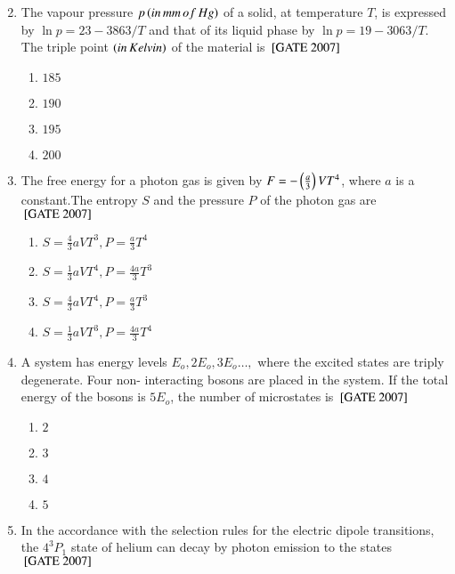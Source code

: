 \documentclass[journal]{IEEEtran}
\begin{document}
\begin{enumerate}
\begin{multicols}{4}
\begin{enumerate}
\end{enumerate}
\end{multicols}
\item The vapour pressure $p\left(in \, mm \, of \,Hg\right)$ of a solid, at temperature $T$, is expressed by $\ln{p}=23-3863/T$ and that of its liquid phase by $\ln{p}= 19-3063/T$. The triple point $\left(in \, Kelvin\right)$ of the material is \hfill{${}\left[\text{GATE 2007}\right]$} 
\begin{multicols}{4}
\begin{enumerate}
    \item $185$
    \item $190$
    \item $195$
    \item $200$
\end{enumerate}
\end{multicols}
\item The free energy for a photon gas is given by $F = -\left(\frac{a}{3}\right)VT^4$, where $a$ is a constant.The entropy $S$ and the pressure $P$ of the photon gas are \hfill{${}\left[\text{GATE 2007}\right]$} 
\begin{multicols}{2}
\begin{enumerate}
    \item $S=\frac{4}{3}aVT^3, P=\frac{a}{3}T^4$
    \item $S=\frac{1}{3}aVT^4, P=\frac{4a}{3}T^3$
    \item $S=\frac{4}{3}aVT^4, P=\frac{a}{3}T^3$
    \item $S=\frac{1}{3}aVT^3, P=\frac{4a}{3}T^4$
\end{enumerate}
\end{multicols}
\item A system has energy levels $E_o,2E_o,3E_o\dots,$ where the excited states are triply degenerate. Four non- interacting bosons are placed in the system. If the total energy of the bosons is $5E_o$, the number of microstates is \hfill{${}\left[\text{GATE 2007}\right]$} 
\begin{multicols}{4}
\begin{enumerate}
    \item $2$
    \item $3$
    \item $4$
    \item $5$
\end{enumerate}
\end{multicols}
\item In the accordance with the selection rules for the electric dipole transitions, the $4^3P_1$ state of helium can decay by photon emission to the states \hfill{${}\left[\text{GATE 2007}\right]$} 

\end{enumerate}
\end{document}
